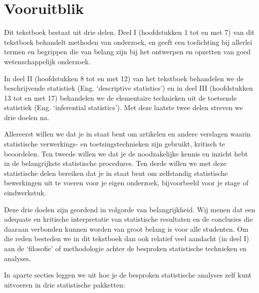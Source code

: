 \documentclass[
]{book}
\begin{document}
\section{Vooruitblik}\label{sec:vooruitblik}

Dit tekstboek bestaat uit drie delen. Deel I (hoofdstukken 1 tot en met 7) van dit tekstboek behandelt
methoden van onderzoek, en geeft een toelichting bij allerlei termen en
begrippen die van belang zijn bij het ontwerpen en opzetten van goed
wetenschappelijk onderzoek.

In deel II (hoofdstukken 8 tot en met 12) van het tekstboek behandelen we de beschrijvende statistiek
(Eng. `descriptive statistics') en in deel III (hoofdstukken 13 tot en met 17) behandelen we de
elementaire technieken uit de toetsende statistiek (Eng. `inferential
statistics'). Met deze laatste twee delen streven we drie doelen na.

Allereerst willen we dat je in staat bent om artikelen en andere verslagen waarin
statistische verwerkings- en toetsingstechnieken zijn gebruikt, kritisch
te beoordelen.
Ten tweede willen we dat je de noodzakelijke
kennis en inzicht hebt in de belangrijkste statistische procedures.
Ten derde willen we met deze statistische delen bereiken dat je in staat
bent om zelfstandig statistische bewerkingen uit te voeren voor je eigen
onderzoek, bijvoorbeeld voor je stage of eindwerkstuk.

Deze drie doelen zijn geordend in volgorde van belangrijkheid. Wij menen
dat een adequate en kritische interpretatie van statistische resultaten
en de conclusies die daaraan verbonden kunnen worden van groot belang is
voor alle studenten. Om die reden besteden we in dit tekstboek dan ook
relatief veel aandacht (in deel I) aan de `filosofie' of methodologie achter de besproken statistische technieken en analyses.

In aparte secties leggen we uit hoe je de besproken statistische analyses zelf kunt uitvoeren in drie statistische pakketten:
\end{document}
